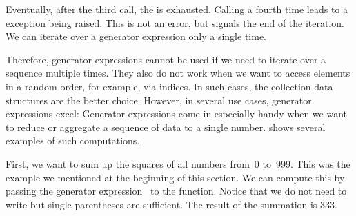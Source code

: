 Eventually, after the third  call, the  is exhausted.
Calling  a fourth time leads to a  exception being raised.
This is not an error, but signals the end of the iteration.
We can iterate over a generator expression only a single time.

Therefore, generator expressions cannot be used if we need to iterate over a sequence multiple times.
They also do not work when we want to access elements in a random order, for example, via indices.
In such cases, the collection data structures are the better choice.
However, in several use cases, generator expressions excel:%
%
%
%
%
%
%
Generator expressions come in especially handy when we want to reduce or aggregate a sequence of data to a single number.
 shows several examples of such computations.

First, we want to sum up the squares of all numbers from~0 to~999.
This was the example we mentioned at the beginning of this section.
We can compute this by passing the generator expression~ to the  function.
Notice that we do not need to write  but single parentheses are sufficient.
The result of the summation is 333.

